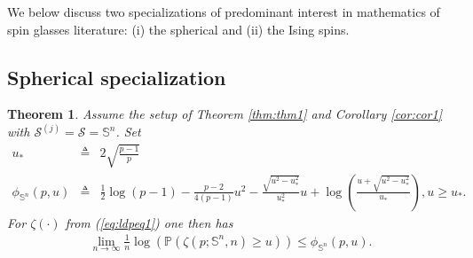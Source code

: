 \documentclass[10pt]{article}
\def\mS{{\mathbb S}}
\def\mP{{\mathbb P}}
\def\lp{\left (}
\def\rp{\right )}
\def\cS{{\mathcal S}}
\newtheorem{theorem}{Theorem}
\begin{document}
We below discuss two specializations of predominant interest in mathematics of spin glasses literature: (i) the spherical and (ii) the Ising spins.






\subsection{Spherical specialization}
\label{sec:ldpsph}

\begin{theorem}
  \label{thm:thm3}
 Assume the setup of Theorem \ref{thm:thm1} and Corollary \ref{cor:cor1}  with $\cS^{(j)} = \cS = \mS^n$. Set
 \begin{eqnarray}
 \label{eq:thm3eq0}
u_* & \triangleq  & 2 \sqrt{\frac{ p-1 }{p} }
\nonumber \\
\phi_{\mS^n}(p,u)
& \triangleq &
  \frac{1}{2} \log \lp p-1  \rp  -\frac{p-2}{4(p-1)}u^2
  - \frac{ \sqrt{ u^2 - u_*^2   }   }{u_*^2 } u  + \log\lp \frac{ u + \sqrt{u^2 -  u_*^2 } }{  u_*    }  \rp ,  u\geq u_*.
 \end{eqnarray}
 For $\zeta(\cdot)$ from  (\ref{eq:ldpeq1}) one then has
 \begin{eqnarray}
 \label{eq:thm3eq1}
 \lim_{n\rightarrow \infty }  \frac{1}{n} \log \lp \mP \lp \zeta(p;\mS^n,n) \geq u \rp \rp  \leq \phi_{\mS^n}(p,u) .
  \end{eqnarray}
\end{theorem}
\end{document}
